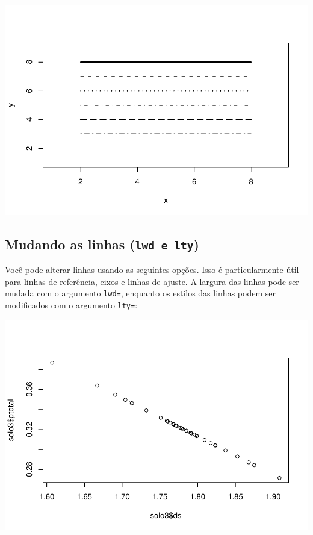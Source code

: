 \documentclass[
]{book}
\newenvironment{Shaded}{\begin{snugshade}}{\end{snugshade}}
\newcommand{\CommentTok}[1]{\textcolor[rgb]{0.56,0.35,0.01}{\textit{#1}}}
\newcommand{\DataTypeTok}[1]{\textcolor[rgb]{0.13,0.29,0.53}{#1}}
\newcommand{\DecValTok}[1]{\textcolor[rgb]{0.00,0.00,0.81}{#1}}
\newcommand{\KeywordTok}[1]{\textcolor[rgb]{0.13,0.29,0.53}{\textbf{#1}}}
\newcommand{\NormalTok}[1]{#1}
\newcommand{\OperatorTok}[1]{\textcolor[rgb]{0.81,0.36,0.00}{\textbf{#1}}}
\begin{document}
\includegraphics{TudodoR_files/figure-latex/unnamed-chunk-159-1.pdf}

\hypertarget{mudando-as-linhas-lwd-e-lty}{%
\subsection{\texorpdfstring{Mudando as linhas (\texttt{lwd\ e\ lty})}{Mudando as linhas (lwd e lty)}}\label{mudando-as-linhas-lwd-e-lty}}

Você pode alterar linhas usando as seguintes opções. Isso é particularmente útil para linhas de referência, eixos e linhas de ajuste. A largura das linhas pode ser mudada com o argumento \texttt{lwd=}, enquanto os estilos das linhas podem ser modificados com o argumento \texttt{lty=}:

\begin{Shaded}
\end{Shaded}

\includegraphics{TudodoR_files/figure-latex/unnamed-chunk-160-1.pdf}
\end{document}
